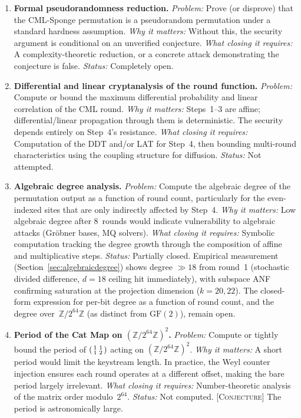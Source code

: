 \documentclass[runningheads]{llncs}
\newcommand{\conjecture}[1]{\textsc{[Conjecture]} #1}
\newcommand{\Ztwo}{\mathbb{Z}/2^{64}\mathbb{Z}}
\begin{document}
\begin{enumerate}

\item \textbf{Formal pseudorandomness reduction.}
  \emph{Problem:} Prove (or disprove) that the CML-Sponge permutation is
  a pseudorandom permutation under a standard hardness assumption.
  \emph{Why it matters:} Without this, the security argument is conditional
  on an unverified conjecture.
  \emph{What closing it requires:} A complexity-theoretic reduction, or a
  concrete attack demonstrating the conjecture is false.
  \emph{Status:} Completely open.

\item \textbf{Differential and linear cryptanalysis of the round function.}
  \emph{Problem:} Compute or bound the maximum differential probability and
  linear correlation of the CML round.
  \emph{Why it matters:} Steps~1--3 are affine; differential/linear propagation
  through them is deterministic.  The security depends entirely on Step~4's
  resistance.
  \emph{What closing it requires:} Computation of the DDT and/or LAT for
  Step~4, then bounding multi-round characteristics using the coupling
  structure for diffusion.
  \emph{Status:} Not attempted.

\item \textbf{Algebraic degree analysis.}
  \emph{Problem:} Compute the algebraic degree of the permutation output as a
  function of round count, particularly for the even-indexed sites that are
  only indirectly affected by Step~4.
  \emph{Why it matters:} Low algebraic degree after 8~rounds would indicate
  vulnerability to algebraic attacks (Gr\"obner bases, MQ solvers).
  \emph{What closing it requires:} Symbolic computation tracking the degree
  growth through the composition of affine and multiplicative steps.
  \emph{Status:} Partially closed.  Empirical measurement
  (Section~\ref{sec:algebraicdegree}) shows degree $\gg 18$ from round~1
  (stochastic divided difference, $d = 18$ ceiling hit immediately), with subspace
  ANF confirming saturation at the projection dimension ($k = 20, 22$).  The
  closed-form expression for per-bit degree as a function of round count, and the
  degree over~$\Ztwo$ (as distinct from $\mathrm{GF}(2)$), remain open.

\item \textbf{Period of the Cat Map on $(\Ztwo)^2$.}
  \emph{Problem:} Compute or tightly bound the period of
  $\begin{psmallmatrix}1&1\\1&2\end{psmallmatrix}$ acting on $(\Ztwo)^2$.
  \emph{Why it matters:} A short period would limit the keystream length.
  In practice, the Weyl counter injection ensures each round operates
  at a different offset, making the bare period largely irrelevant.
  \emph{What closing it requires:} Number-theoretic analysis of the matrix
  order modulo~$2^{64}$.
  \emph{Status:} Not computed.  \conjecture{The period is astronomically large.}


\end{enumerate}
\end{document}
